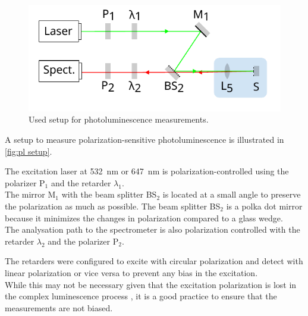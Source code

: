 \documentclass[
	twoside,
	parskip=half,
	a4paper,
]{scrbook}
\begin{document}
\begin{figure}
	\centering
	\includegraphics{../figures/setup_simplified.pdf}
	\caption{Used setup for photoluminescence measurements.}
	\label{fig:pl setup}
\end{figure}
A setup to measure polarization-sensitive photoluminescence is illustrated in \autoref{fig:pl setup}.

The excitation laser at \SI{532}{nm} or \SI{647}{nm} is polarization-controlled using the polarizer P$_1$ and the retarder $\lambda_1$.\\
The mirror M$_1$ with the beam splitter BS$_2$ is located at a small angle to preserve the polarization as much as possible.
The beam splitter BS$_2$ is a polka dot mirror because it minimizes the changes in polarization compared to a glass wedge.\\
The analysation path to the spectrometer is also polarization controlled with the retarder $\lambda_2$ and the polarizer P$_2$.

The retarders were configured to excite with circular polarization and detect with linear polarization or vice versa to prevent any bias in the excitation.\\
While this may not be necessary given that the excitation polarization is lost in the complex luminescence process \cite{NiPS3_linear}, it is a good practice to ensure that the measurements are not biased.
\end{document}
